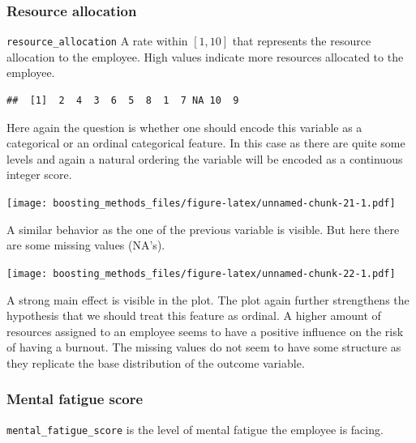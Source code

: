 \documentclass[
]{book}
\newenvironment{Shaded}{\begin{snugshade}}{\end{snugshade}}
\newcommand{\CommentTok}[1]{\textcolor[rgb]{0.56,0.35,0.01}{\textit{#1}}}
\newcommand{\FunctionTok}[1]{\textcolor[rgb]{0.00,0.00,0.00}{#1}}
\newcommand{\NormalTok}[1]{#1}
\newcommand{\SpecialCharTok}[1]{\textcolor[rgb]{0.00,0.00,0.00}{#1}}
\begin{document}
\hypertarget{resource-allocation}{%
\subsubsection{Resource allocation}\label{resource-allocation}}

\texttt{resource\_allocation} A rate within \([1,10]\) that represents the resource allocation to the employee. High values indicate more resources allocated to the employee.

\begin{Shaded}
\end{Shaded}

\begin{verbatim}
##  [1]  2  4  3  6  5  8  1  7 NA 10  9
\end{verbatim}

Here again the question is whether one should encode this variable as a categorical or an ordinal categorical feature. In this case as there are quite some levels and again a natural ordering the variable will be encoded as a continuous integer score.

\texttt{[image: boosting\_methods\_files/figure-latex/unnamed-chunk-21-1.pdf]}

A similar behavior as the one of the previous variable is visible. But here there are some missing values (NA's).

\texttt{[image: boosting\_methods\_files/figure-latex/unnamed-chunk-22-1.pdf]}

A strong main effect is visible in the plot. The plot again further strengthens the hypothesis that we should treat this feature as ordinal. A higher amount of resources assigned to an employee seems to have a positive influence on the risk of having a burnout. The missing values do not seem to have some structure as they replicate the base distribution of the outcome variable.

\hypertarget{mental-fatigue-score}{%
\subsubsection{Mental fatigue score}\label{mental-fatigue-score}}

\texttt{mental\_fatigue\_score} is the level of mental fatigue the employee is facing.
\end{document}
